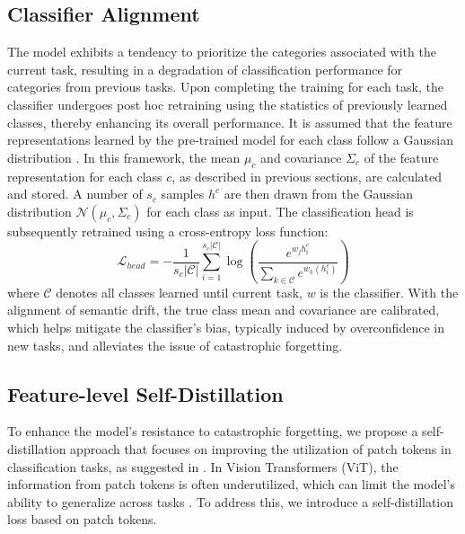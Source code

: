 \subsection{Classifier Alignment}
The model exhibits a tendency to prioritize the categories associated with the current task, resulting in a degradation of classification performance for categories from previous tasks. Upon completing the training for each task, the classifier undergoes post hoc retraining using the statistics of previously learned classes, thereby enhancing its overall performance. It is assumed that the feature representations learned by the pre-trained model for each class follow a Gaussian distribution \cite{zhang2023slca}. In this framework, the mean $\mu_c$ and covariance $\Sigma_c$ of the feature representation for each class $c$, as described in previous sections, are calculated and stored. A number of $s_c$ samples $h^c$ are then drawn from the Gaussian distribution $\mathcal{N}(\mu_c, \Sigma_c)$ for each class as input. The classification head is subsequently retrained using a cross-entropy loss function:
\begin{equation}
    \mathcal{L}_{head} = -\frac{1}{s_c|\mathcal{C}|} \sum_{i=1}^{s_c|\mathcal{C}|} \log \left( \frac{e^{w_j{h^c_i}}}{\sum_{k \in \mathcal{C}} e^{w_k(h^c_i)}} \right)
\end{equation}
where $\mathcal{C}$ denotes all classes learned until current task, $w$ is the classifier. With the alignment of semantic drift, the true class mean and covariance are calibrated, which helps mitigate the classifier’s bias, typically induced by overconfidence in new tasks, and alleviates the issue of catastrophic forgetting.

\subsection{Feature-level Self-Distillation}
To enhance the model's resistance to catastrophic forgetting, we propose a self-distillation approach that focuses on improving the utilization of patch tokens in classification tasks, as suggested in \cite{li2024dynamic}. In Vision Transformers (ViT), the information from patch tokens is often underutilized, which can limit the model's ability to generalize across tasks \cite{zhai2024fine}. To address this, we introduce a self-distillation loss based on patch tokens.

